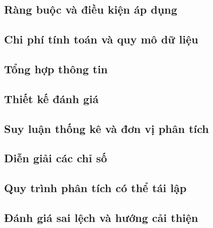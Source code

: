 \par{}
\subsection{Ràng buộc và điều kiện áp dụng}\label{subsection:methods-8}

\par{}
\subsection{Chi phí tính toán và quy mô dữ liệu}\label{subsection:methods-9}

\par{}
\subsection{Tổng hợp thông tin}\label{subsection:methods-10}

\par{}
\subsection{Thiết kế đánh giá}\label{subsection:methods-11}

\par{}
\subsection{Suy luận thống kê và đơn vị phân tích}\label{subsection:methods-12}

\par{}
\subsection{Diễn giải các chỉ số}\label{subsection:methods-13}

\par{}
\subsection{Quy trình phân tích có thể tái lập}\label{subsection:methods-14}

\par{}
\subsection{Đánh giá sai lệch và hướng cải thiện}\label{subsection:methods-15}

